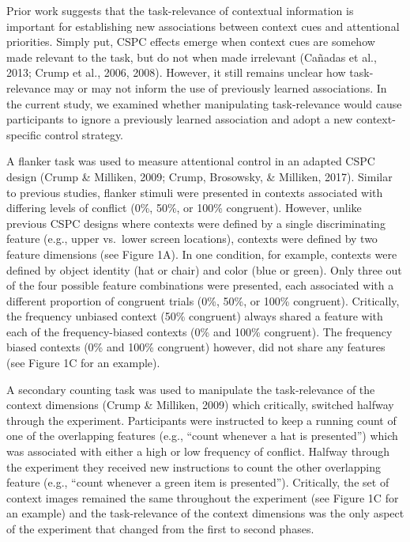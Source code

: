 \documentclass[english,,man,floatsintext]{apa6}
\begin{document}
Prior work suggests that the task-relevance of contextual information is
important for establishing new associations between context cues and
attentional priorities. Simply put, CSPC effects emerge when context
cues are somehow made relevant to the task, but do not when made
irrelevant (Cañadas et al., 2013; Crump et al., 2006, 2008). However, it
still remains unclear how task-relevance may or may not inform the use
of previously learned associations. In the current study, we examined
whether manipulating task-relevance would cause participants to ignore a
previously learned association and adopt a new context-specific control
strategy.

A flanker task was used to measure attentional control in an adapted
CSPC design (Crump \& Milliken, 2009; Crump, Brosowsky, \& Milliken,
2017). Similar to previous studies, flanker stimuli were presented in
contexts associated with differing levels of conflict (0\%, 50\%, or
100\% congruent). However, unlike previous CSPC designs where contexts
were defined by a single discriminating feature (e.g., upper vs.~lower
screen locations), contexts were defined by two feature dimensions (see
Figure 1A). In one condition, for example, contexts were defined by
object identity (hat or chair) and color (blue or green). Only three out
of the four possible feature combinations were presented, each
associated with a different proportion of congruent trials (0\%, 50\%,
or 100\% congruent). Critically, the frequency unbiased context (50\%
congruent) always shared a feature with each of the frequency-biased
contexts (0\% and 100\% congruent). The frequency biased contexts (0\%
and 100\% congruent) however, did not share any features (see Figure 1C
for an example).

A secondary counting task was used to manipulate the task-relevance of
the context dimensions (Crump \& Milliken, 2009) which critically,
switched halfway through the experiment. Participants were instructed to
keep a running count of one of the overlapping features (e.g.,
\enquote{count whenever a hat is presented}) which was associated with
either a high or low frequency of conflict. Halfway through the
experiment they received new instructions to count the other overlapping
feature (e.g., \enquote{count whenever a green item is presented}).
Critically, the set of context images remained the same throughout the
experiment (see Figure 1C for an example) and the task-relevance of the
context dimensions was the only aspect of the experiment that changed
from the first to second phases.
\end{document}
